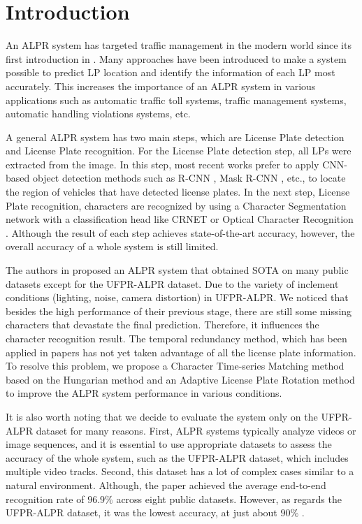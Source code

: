 \documentclass[conference]{IEEEtran}
\begin{document}
\section{Introduction} 

An ALPR system has targeted traffic management in the modern world since its first introduction in \cite{1990}. Many approaches have been introduced to make a system possible to predict LP location and identify the information of each LP most accurately. This increases the importance of an ALPR system in various applications such as automatic traffic toll systems, traffic management systems, automatic handling violations systems, etc.  

A general ALPR system has two main steps, which are License Plate detection and License Plate recognition. For the License Plate detection step, all LPs were extracted from the image. In this step, most recent works prefer to apply CNN-based object detection methods such as R-CNN \cite{rcnn}, Mask R-CNN \cite{maskrcnn}, etc., to locate the region of vehicles that have detected license plates. In the next step, License Plate recognition, characters are recognized by using a Character Segmentation network with a classification head like CRNET \cite{crnet} or Optical Character Recognition \cite{ocr}. Although the result of each step achieves state-of-the-art accuracy, however, the overall accuracy of a whole system is still limited. 

 The authors in \cite{layout} proposed an ALPR system that obtained SOTA on many public datasets except for the UFPR-ALPR dataset. Due to the variety of inclement conditions (lighting, noise, camera distortion) in UFPR-ALPR. We noticed that besides the high performance of their previous stage, there are still some missing characters that devastate the final prediction. Therefore, it influences the character recognition result. The temporal redundancy method, which has been applied in papers \cite{ufpr,layout,temporal} has not yet taken advantage of all the license plate information. To resolve this problem, we propose a Character Time-series Matching method based on the Hungarian method and an Adaptive License Plate Rotation method to improve the ALPR system performance in various conditions. 

It is also worth noting that we decide to evaluate the system only on the UFPR-ALPR dataset for many reasons. First, ALPR systems typically analyze videos or image sequences, and it is essential to use appropriate datasets to assess the accuracy of the whole system, such as the UFPR-ALPR dataset, which includes multiple video tracks. Second, this dataset has a lot of complex cases similar to a natural environment. Although, the paper \cite{layout} achieved the average end-to-end recognition rate of $96.9\%$ across eight public datasets. However, as regards the UFPR-ALPR dataset, it was the lowest accuracy, at just about $90\%$ \cite{layout}.
\end{document}
